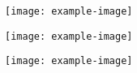 \documentclass{article}
\begin{document}
\begin{figure}[h]
    \centering
    \begin{subfigure}{0.32\textwidth}
        \texttt{[image: example-image]}
        \caption{}
    \end{subfigure}
    \hfill
    \begin{subfigure}{0.32\textwidth}
        \texttt{[image: example-image]}
        \caption{}
    \end{subfigure}
    \hfill
    \begin{subfigure}{0.32\textwidth}
        \texttt{[image: example-image]}
        \caption{}
    \end{subfigure}
    
    \vspace{5mm} %
\end{figure}
\end{document}
